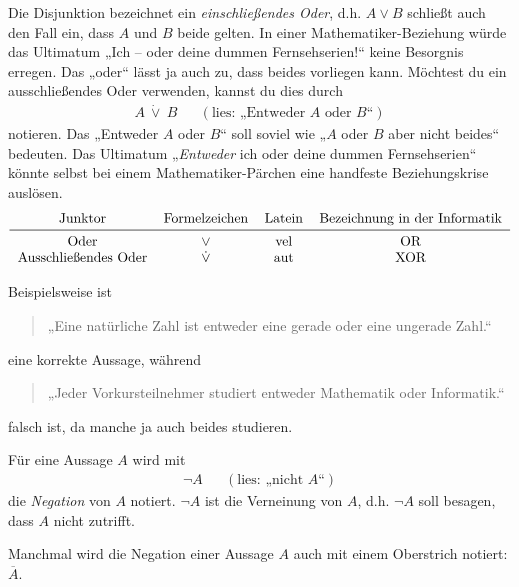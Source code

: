 	
\begin{bem} \label{entwederoder}
    Die Disjunktion bezeichnet ein \emph{einschließendes Oder}, d.h. $A\lor B$ schließt auch den Fall ein, dass $A$ und $B$ beide gelten. In einer Mathematiker-Beziehung würde das Ultimatum „Ich -- oder deine dummen Fernsehserien!“ keine Besorgnis erregen. Das „oder“ lässt ja auch zu, dass beides vorliegen kann. Möchtest du ein ausschließendes Oder verwenden, kannst du dies durch
    \begin{align*}
        A\ \dot\lor\ B && (\text{lies: „Entweder $A$ oder $B$“})
    \end{align*}
    notieren. Das „Entweder $A$ oder $B$“ soll soviel wie „$A$ oder $B$ aber nicht beides“ bedeuten. Das Ultimatum „\emph{Entweder} ich oder deine dummen Fernsehserien“ könnte selbst bei einem Mathematiker-Pärchen eine handfeste Beziehungskrise auslösen.
    \[\begin{tabular}{cccc}
        Junktor &  Formelzeichen & Latein & Bezeichnung in der Informatik \\
        \midrule
        Oder &  $\lor$ & vel & OR \\
        Ausschließendes Oder & $\dot\lor$ & aut & XOR
    \end{tabular}\]
\end{bem}


\begin{bsp}
    Beispielsweise ist
    \begin{quote}
        „Eine natürliche Zahl ist entweder eine gerade oder eine ungerade Zahl.“
    \end{quote}
    eine korrekte Aussage, während
    \begin{quote}
        „Jeder Vorkursteilnehmer studiert entweder Mathematik oder Informatik.“
    \end{quote}
    falsch ist, da manche ja auch beides studieren.
\end{bsp}


\begin{defin}[Negation] 
    Für eine Aussage $A$ wird mit
    \begin{align*}
        \neg A   && (\text{lies: „nicht $A$“})
    \end{align*}
    die \emph{Negation} von $A$ notiert. $\neg A$ ist die Verneinung von $A$, d.h. $\neg A$ soll besagen, dass $A$ nicht zutrifft.
    
    Manchmal wird die Negation einer Aussage $A$ auch mit einem Oberstrich notiert: $\overline{A}$.
\end{defin}


